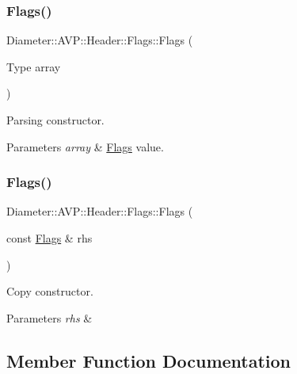 \subsubsection{\texorpdfstring{Flags()}{Flags()}\hspace{0.1cm}{\footnotesize\ttfamily [1/2]}}
{\footnotesize\ttfamily Diameter\+::\+A\+V\+P\+::\+Header\+::\+Flags\+::\+Flags (\begin{DoxyParamCaption}\item[{Type}]{array }\end{DoxyParamCaption})\hspace{0.3cm}{\ttfamily [explicit]}}



Parsing constructor. 


\begin{DoxyParams}{Parameters}
{\em array} & \hyperlink{classDiameter_1_1AVP_1_1Header_1_1Flags}{Flags} value. \\
\hline
\end{DoxyParams}
\mbox{\label{classDiameter_1_1AVP_1_1Header_1_1Flags_a27e14a76ae84079c9d51b44fc6883628}} 
\subsubsection{\texorpdfstring{Flags()}{Flags()}\hspace{0.1cm}{\footnotesize\ttfamily [2/2]}}
{\footnotesize\ttfamily Diameter\+::\+A\+V\+P\+::\+Header\+::\+Flags\+::\+Flags (\begin{DoxyParamCaption}\item[{const \hyperlink{classDiameter_1_1AVP_1_1Header_1_1Flags}{Flags} \&}]{rhs }\end{DoxyParamCaption})\hspace{0.3cm}{\ttfamily [default]}}



Copy constructor. 


\begin{DoxyParams}{Parameters}
{\em rhs} & \\
\hline
\end{DoxyParams}


\subsection{Member Function Documentation}
\mbox{\label{classDiameter_1_1AVP_1_1Header_1_1Flags_aad359a4a25b2998c813c0923e67efeb8}} 

